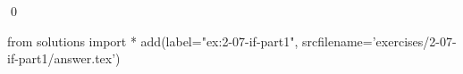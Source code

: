 
\begin{ex}
  \label{ex:2-07-if-part1}
  
  \qed
\end{ex}
\begin{python0}
from solutions import *
add(label="ex:2-07-if-part1",
    srcfilename='exercises/2-07-if-part1/answer.tex')
\end{python0}
